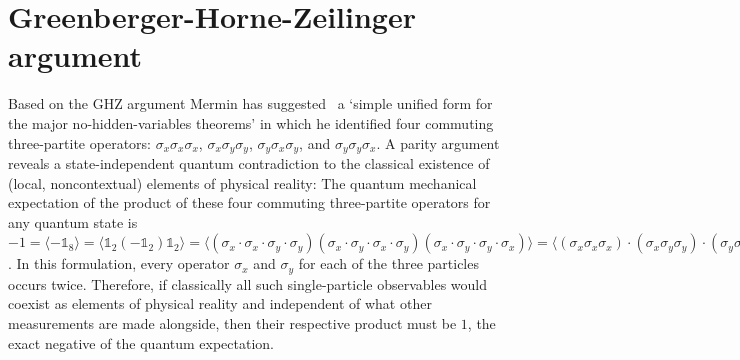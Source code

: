 \documentclass[
  twocolumn,
 showpacs,
 showkeys,
 preprintnumbers,
 amsmath,amssymb,
 aps,
 pra,
  longbibliography,
 floatfix,
 ]{revtex4-2}
\newcommand\myotimes{ }
\begin{document}
\section{Greenberger-Horne-Zeilinger argument}


Based on the GHZ argument Mermin has suggested~\cite{mermin,mermin90b} a `simple unified form for the major no-hidden-variables theorems' in which he identified four commuting three-partite operators:
$\sigma_x \myotimes  \sigma_x \myotimes  \sigma_x$, $\sigma_x \myotimes  \sigma_y \myotimes  \sigma_y$, $\sigma_y \myotimes  \sigma_x \myotimes  \sigma_y$, and $\sigma_y \myotimes  \sigma_y \myotimes  \sigma_x$.
A parity argument reveals a state-independent quantum contradiction to the classical existence of (local, noncontextual) elements of physical reality:
The quantum mechanical expectation of the product of these four commuting three-partite operators for any quantum state is
$
-1= \langle
-\mathbb{1}_8
 \rangle
=
\langle
\mathbb{1}_2
\myotimes
(
-\mathbb{1}_2
)
\myotimes
\mathbb{1}_2
 \rangle
=
\langle
(
\sigma_x  \cdot \sigma_x  \cdot \sigma_y   \cdot \sigma_y
)
\myotimes
(
\sigma_x   \cdot \sigma_y   \cdot \sigma_x   \cdot  \sigma_y
)
\myotimes
(
\sigma_x   \cdot \sigma_y    \cdot \sigma_y    \cdot \sigma_x
) \rangle
=
\langle  (\sigma_x \myotimes  \sigma_x \myotimes  \sigma_x) \cdot (\sigma_x \myotimes  \sigma_y \myotimes  \sigma_y) \cdot (\sigma_y \myotimes  \sigma_x \myotimes  \sigma_y) \cdot (\sigma_y \myotimes  \sigma_y \myotimes  \sigma_x) \rangle
=
\langle  \sigma_x \myotimes  \sigma_x \myotimes  \sigma_x  \rangle \langle \sigma_x \myotimes  \sigma_y \myotimes  \sigma_y  \rangle \langle
\sigma_y \myotimes  \sigma_x \myotimes  \sigma_y  \rangle \langle   \sigma_y \myotimes  \sigma_y \myotimes  \sigma_x \rangle
$.
In this formulation, every operator $\sigma_x$ and $\sigma_y$ for each of the three particles occurs twice. Therefore, if classically all such single-particle observables would coexist as elements of physical reality and independent of what other measurements are made alongside,
then their respective product must be $1$, the exact negative of the quantum expectation.
\end{document}
